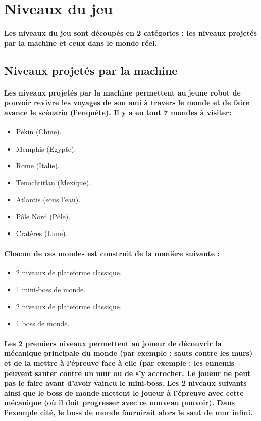 \documentclass{report}
\begin{document}
			\section{Niveaux du jeu}

\paragraph{Les niveaux du jeu sont d\'{e}coup\'{e}s en 2 cat\'{e}gories : les niveaux projet\'{e}s par la machine et ceux dans le monde r\'{e}el.}

				\subsection{Niveaux projet\'{e}s par la machine}

\paragraph{Les niveaux projet\'{e}s par la machine permettent au jeune robot de pouvoir revivre les voyages de son ami à travers le monde et de faire avance le sc\'{e}nario (l’enquête). Il y a en tout 7 mondes à visiter:}

\begin{itemize}
\item P\'{e}kin (Chine).
\item Memphis (Egypte).
\item Rome (Italie).
\item Tenochtitlan (Mexique).
\item Atlantis (sous l’eau).
\item Pôle Nord (Pôle).
\item Crat\`{e}res (Lune).
\end{itemize}

\paragraph{Chacun de ces mondes est construit de la mani\`{e}re suivante :}

\begin{itemize}
\item 2 niveaux de plateforme classique.
\item 1 mini-boss de monde.
\item 2 niveaux de plateforme classique.
\item 1 boss de monde.
\end{itemize}

\paragraph{Les 2 premiers niveaux permettent au joueur de d\'{e}couvrir la m\'{e}canique principale du monde (par exemple : sauts contre les murs) et de la mettre à l’\'{e}preuve face à elle (par exemple : les ennemis peuvent sauter contre un mur ou de s’y accrocher. Le joueur ne peut pas le faire avant d’avoir vaincu le mini-boss. Les 2 niveaux suivants ainsi que le boss de monde mettent le joueur à l’\'{e}preuve avec cette m\'{e}canique (où il doit progresser avec ce nouveau pouvoir). Dans l’exemple cit\'{e}, le boss de monde fournirait alors le saut de mur infini.}
\end{document}
